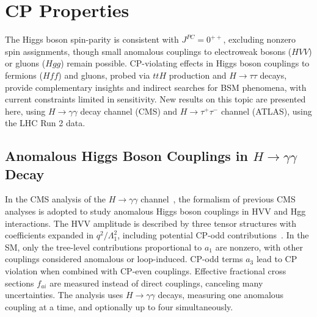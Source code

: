 \documentclass[a4paper,11pt]{article}
\begin{document}
\section{CP Properties}

The Higgs boson spin-parity is consistent with $J^{PC}=0^{++}$,
excluding nonzero spin assignments, though small anomalous couplings
to electroweak bosons ($HVV$) or gluons ($Hgg$) remain possible.
CP-violating effects in Higgs boson couplings to fermions ($Hff$) and
gluons, probed via $ttH$ production and $H \to \tau\tau$ decays,
provide complementary insights and indirect searches for BSM
phenomena, with current constraints limited in sensitivity.  New
results on this topic are presented here, using $H\to\gamma\gamma$ decay
channel (CMS) and $H\to\tau^+\tau^-$ channel (ATLAS), using the LHC
Run 2 data.

\subsection{Anomalous Higgs Boson Couplings in $H\to\gamma\gamma$ Decay}

In the CMS analysis of the $H \to \gamma\gamma$
channel~\cite{hggac-cms}, the formalism of previous CMS analyses is
adopted to study anomalous Higgs boson couplings in HVV and Hgg
interactions.  The HVV amplitude is described by three tensor
structures with coefficients expanded in $q^2/\Lambda^2_1$, including
potential CP-odd contributions~\cite{Gao:2010qx}. In the SM, only the
tree-level contributions proportional to $a_1$ are nonzero, with other
couplings considered anomalous or loop-induced.  CP-odd terms $a_3$
lead to CP violation when combined with CP-even couplings.  Effective
fractional cross sections $f_{ai}$ are measured instead of direct
couplings, canceling many uncertainties. The analysis uses $H \to
\gamma\gamma$ decays, measuring one anomalous coupling at a time, and
optionally up to four simultaneously.
\end{document}
